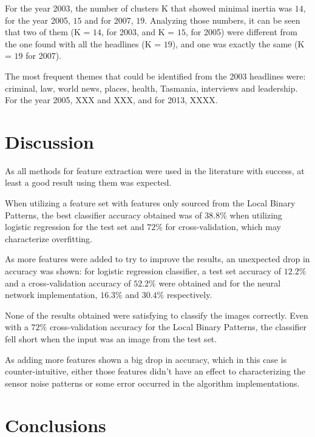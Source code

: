 \documentclass[10pt,twocolumn,letterpaper]{article}
\begin{document}
For the year 2003, the number of clusters K that showed minimal inertia was $14$, for the year 2005, $15$ and for 2007, $19$. Analyzing those numbers, it can be seen that two of them (K = $14$, for 2003, and K = $15$, for 2005) were different from the one found with all the headlines (K = $19$), and one was exactly the same (K = $19$ for 2007).

The most frequent themes that could be identified from the 2003 headlines were: criminal, law, world news, places, health, Tasmania, interviews and leadership. For the year 2005, XXX and XXX, and for 2013, XXXX.


\section{Discussion}

As all methods for feature extraction were used in the literature with success, at least a good result using them was expected. 

When utilizing a feature set with features only sourced from the Local Binary Patterns, the best classifier accuracy obtained was of $38.8\%$ when utilizing logistic regression for the test set and $72\%$ for cross-validation, which may characterize overfitting.

As more features were added to try to improve the results, an unexpected drop in accuracy was shown: for logistic regression classifier, a test set accuracy of $12.2\%$ and a cross-validation accuracy of $52.2\%$ were obtained and for the neural network implementation, $16.3\%$ and $30.4\%$ respectively.
   
None of the results obtained were satisfying to classify the images correctly. Even with a $72\%$ cross-validation accuracy for the Local Binary Patterns, the classifier fell short when the input was an image from the test set.

As adding more features shown a big drop in accuracy, which in this case is counter-intuitive, either those features didn't have an effect to characterizing the sensor noise patterns or some error occurred in the algorithm implementations.

\section{Conclusions}
\end{document}
